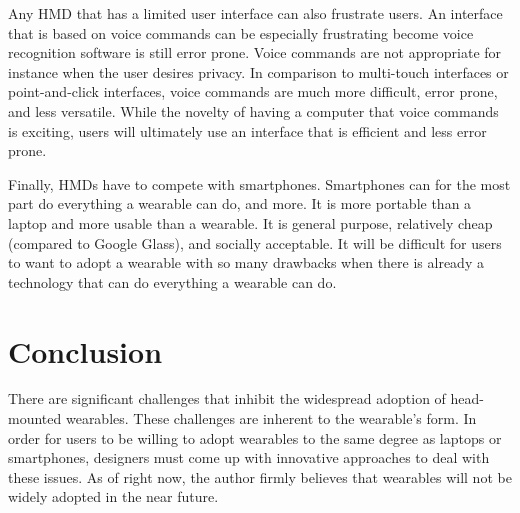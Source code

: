 \documentclass[11pt]{article}
\newcommand{\myreferences}{references}
\begin{document}
Any HMD that has a limited user interface can also frustrate users. An interface that is based on voice commands can be especially frustrating become voice recognition software is still error prone. Voice commands are not appropriate for instance when the user desires privacy. In comparison to multi-touch interfaces or point-and-click interfaces, voice commands are much more difficult, error prone, and less versatile. While the novelty of having a computer that voice commands is exciting, users will ultimately use an interface that is efficient and less error prone. 

Finally, HMDs have to compete with smartphones. Smartphones can for the most part do everything a wearable can do, and more. It is more portable than a laptop and more usable than a wearable. It is general purpose, relatively cheap (compared to Google Glass), and socially acceptable. It will be difficult for users to want to adopt a wearable with so many drawbacks when there is already a technology that can do everything a wearable can do.

\section{Conclusion}

There are significant challenges that inhibit the widespread adoption of head-mounted wearables. These challenges are inherent to the wearable's form. In order for users to be willing to adopt wearables to the same degree as laptops or smartphones, designers must come up with innovative approaches to deal with these issues. As of right now, the author firmly believes that wearables will not be widely adopted in the near future.



\end{document}
